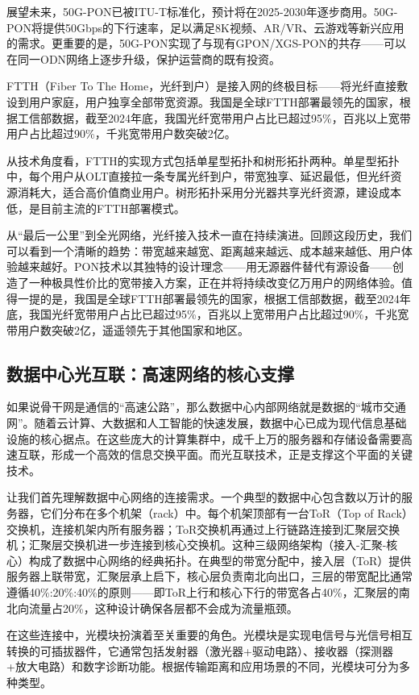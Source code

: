 展望未来，50G-PON已被ITU-T标准化，预计将在2025-2030年逐步商用。50G-PON将提供50Gbps的下行速率，足以满足8K视频、AR/VR、云游戏等新兴应用的需求。更重要的是，50G-PON实现了与现有GPON/XGS-PON的共存——可以在同一ODN网络上逐步升级，保护运营商的既有投资。

FTTH（Fiber To The Home，光纤到户）是接入网的终极目标——将光纤直接敷设到用户家庭，用户独享全部带宽资源。我国是全球FTTH部署最领先的国家，根据工信部数据，截至2024年底，我国光纤宽带用户占比已超过95\%，百兆以上宽带用户占比超过90\%，千兆宽带用户数突破2亿。

从技术角度看，FTTH的实现方式包括单星型拓扑和树形拓扑两种。单星型拓扑中，每个用户从OLT直接拉一条专属光纤到户，带宽独享、延迟最低，但光纤资源消耗大，适合高价值商业用户。树形拓扑采用分光器共享光纤资源，建设成本低，是目前主流的FTTH部署模式。

从“最后一公里”到全光网络，光纤接入技术一直在持续演进。回顾这段历史，我们可以看到一个清晰的趋势：带宽越来越宽、距离越来越远、成本越来越低、用户体验越来越好。PON技术以其独特的设计理念——用无源器件替代有源设备——创造了一种极具性价比的宽带接入方案，正在并将持续改变亿万用户的网络体验。值得一提的是，我国是全球FTTH部署最领先的国家，根据工信部数据，截至2024年底，我国光纤宽带用户占比已超过95\%，百兆以上宽带用户占比超过90\%，千兆宽带用户数突破2亿，遥遥领先于其他国家和地区。

\subsection{数据中心光互联：高速网络的核心支撑}

如果说骨干网是通信的“高速公路”，那么数据中心内部网络就是数据的“城市交通网”。随着云计算、大数据和人工智能的快速发展，数据中心已成为现代信息基础设施的核心据点。在这些庞大的计算集群中，成千上万的服务器和存储设备需要高速互联，形成一个高效的信息交换平面。而光互联技术，正是支撑这个平面的关键技术。

让我们首先理解数据中心网络的连接需求。一个典型的数据中心包含数以万计的服务器，它们分布在多个机架（rack）中。每个机架顶部有一台ToR（Top of Rack）交换机，连接机架内所有服务器；ToR交换机再通过上行链路连接到汇聚层交换机；汇聚层交换机进一步连接到核心交换机。这种三级网络架构（接入-汇聚-核心）构成了数据中心网络的经典拓扑。在典型的带宽分配中，接入层（ToR）提供服务器上联带宽，汇聚层承上启下，核心层负责南北向出口，三层的带宽配比通常遵循40\%:20\%:40\%的原则——即ToR上行和核心下行的带宽各占40\%，汇聚层的南北向流量占20\%，这种设计确保各层都不会成为流量瓶颈。

在这些连接中，光模块扮演着至关重要的角色。光模块是实现电信号与光信号相互转换的可插拔器件，它通常包括发射器（激光器+驱动电路）、接收器（探测器+放大电路）和数字诊断功能。根据传输距离和应用场景的不同，光模块可分为多种类型。

